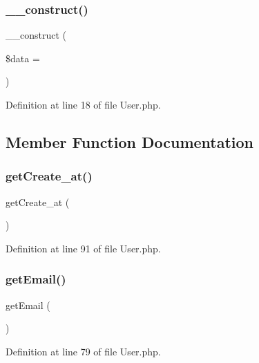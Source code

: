 \subsubsection{\+\_\+\+\_\+construct()}
{\footnotesize\ttfamily \+\_\+\+\_\+construct (\begin{DoxyParamCaption}\item[{}]{\$data = {\ttfamily []} }\end{DoxyParamCaption})}



Definition at line 18 of file User.\+php.



\subsection{Member Function Documentation}
\mbox{\label{class_src_1_1_entity_1_1_user_ae5e6c0bedcef3f514100c20ee92c901a}} 
\subsubsection{get\+Create\+\_\+at()}
{\footnotesize\ttfamily get\+Create\+\_\+at (\begin{DoxyParamCaption}{ }\end{DoxyParamCaption})}



Definition at line 91 of file User.\+php.

\mbox{\label{class_src_1_1_entity_1_1_user_a02a01849f28e2535e888ae4ec87b20f2}} 
\subsubsection{get\+Email()}
{\footnotesize\ttfamily get\+Email (\begin{DoxyParamCaption}{ }\end{DoxyParamCaption})}



Definition at line 79 of file User.\+php.

\mbox{\label{class_src_1_1_entity_1_1_user_a12251d0c022e9e21c137a105ff683f13}} 

